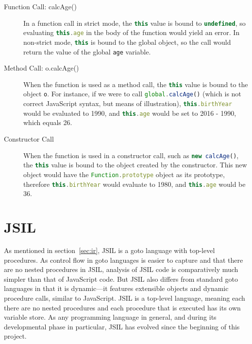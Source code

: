 \documentclass[a4paper,11pt,twoside]{report}
\def\jsinline{\lstinline[language=JavaScript, basicstyle=\small]}%\end{lstlisting}
\begin{document}
\begin{description}
\item[Function Call: calcAge()] In a function call in strict mode, the \jsinline|this| value is bound to \jsinline|undefined|, so evaluating \jsinline|this.age| in the body of the function would yield an error. In non-strict mode, \jsinline|this| is bound to the global object, so the call would return the value of the global \jsinline|age| variable.

\item[Method Call: o.calcAge()] When the function is used as a method call, the \jsinline|this| value is bound to the object \jsinline|o|. For instance, if we were to call \jsinline|global.calcAge()| (which is not correct JavaScript syntax, but means of illustration), \jsinline|this.birthYear| would be evaluated to 1990, and \jsinline|this.age| would be set to 2016 - 1990, which equals 26.

\item[Constructor Call] When the function is used in a constructor call, such as \jsinline|new calcAge()|, the \jsinline|this| value is bound to the object created by the constructor. This new object would have the \jsinline|Function.prototype| object as its prototype, therefore \jsinline|this.birthYear| would evaluate to 1980, and \jsinline|this.age| would be 36.
\end{description}


\chapter{JSIL}\label{sec:jsil}
As mentioned in section~\ref{sec:ir}, JSIL is a goto language with top-level procedures. As control flow in goto languages is easier to capture and that there are no nested procedures in JSIL, analysis of JSIL code is comparatively much simpler than that of JavaScript code. But JSIL also differs from standard goto languages in that it is dynamic---it features extensible objects and dynamic procedure calls, similar to JavaScript. JSIL is a top-level language, meaning each there are no nested procedures and each procedure that is executed has its own variable store. As any programming language in general, and during its developmental phase in particular, JSIL has evolved since the beginning of this project. 
\end{document}
